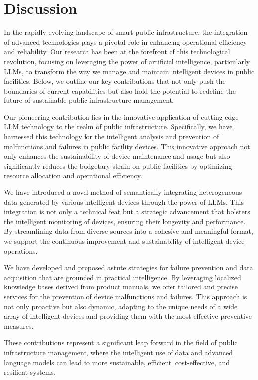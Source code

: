 \documentclass[preprint,12pt]{elsarticle}
\begin{document}
\section{Discussion}
In the rapidly evolving landscape of smart public infrastructure, the integration of advanced technologies plays a pivotal role in enhancing operational efficiency and reliability. Our research has been at the forefront of this technological revolution, focusing on leveraging the power of artificial intelligence, particularly LLMs, to transform the way we manage and maintain intelligent devices in public facilities. Below, we outline our key contributions that not only push the boundaries of current capabilities but also hold the potential to redefine the future of sustainable public infrastructure management.



Our pioneering contribution lies in the innovative application of cutting-edge LLM technology to the realm of public infrastructure. Specifically, we have harnessed this technology for the intelligent analysis and prevention of malfunctions and failures in public facility devices. This innovative approach not only enhances the sustainability of device maintenance and usage but also significantly reduces the budgetary strain on public facilities by optimizing resource allocation and operational efficiency.

We have introduced a novel method of semantically integrating heterogeneous data generated by various intelligent devices through the power of LLMs. This integration is not only a technical feat but a strategic advancement that bolsters the intelligent monitoring of devices, ensuring their longevity and performance. By streamlining data from diverse sources into a cohesive and meaningful format, we support the continuous improvement and sustainability of intelligent device operations.

We have developed and proposed astute strategies for failure prevention and data acquisition that are grounded in practical intelligence. By leveraging localized knowledge bases derived from product manuals, we offer tailored and precise services for the prevention of device malfunctions and failures. This approach is not only proactive but also dynamic, adapting to the unique needs of a wide array of intelligent devices and providing them with the most effective preventive measures.

These contributions represent a significant leap forward in the field of public infrastructure management, where the intelligent use of data and advanced language models can lead to more sustainable, efficient, cost-effective, and resilient systems.
\end{document}
